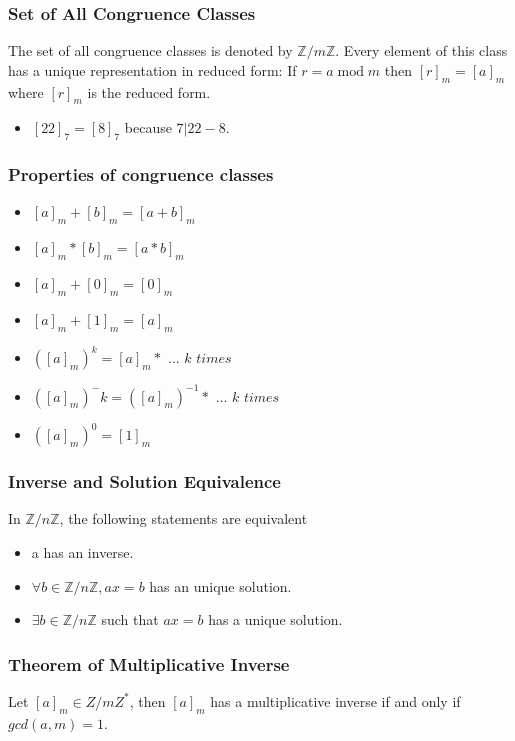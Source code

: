 \documentclass{article}
\begin{document}
\subsubsection{Set of All Congruence Classes} 
\begin{tcolorbox}[width=12.1cm, leftrule=3mm]
The set of all congruence classes is denoted by $ \mathbb{Z} / m\mathbb{Z} $. Every element of this class has a unique representation in reduced form: If $ r = a \;\mathrm{mod}\; m $ then $ [r]_m = [a]_m $ where $ [r]_m $ is the reduced form.
\begin{itemize}
\item $ [22]_7 = [8]_7 $ because $ 7 | 22-8 $.
\end{itemize}
\end{tcolorbox}

\subsubsection{Properties of congruence classes}
\begin{itemize}
\item $ [a]_m + [b]_m = [a+b]_m $
\item $ [a]_m * [b]_m = [a*b]_m $
\item $ [a]_m + [0]_m = [0]_m $
\item $ [a]_m + [1]_m = [a]_m $
\item $ ([a]_m)^k = [a]_m * \textit{ ... k times } $
\item $ ([a]_m)^-k = ([a]_m)^{-1} * \textit{ ... k times } $
\item $ ([a]_m)^0 = [1]_m $
\end{itemize}

\subsubsection{Inverse and Solution Equivalence} In $ \mathbb{Z}/n\mathbb{Z} $, the following statements are equivalent
\begin{itemize}
\item a has an inverse.
\item $ \forall b \in \mathbb{Z}/n\mathbb{Z}, ax = b $ has an unique solution.
\item $ \exists b \in \mathbb{Z}/n\mathbb{Z} $ such that $ ax = b $ has a unique solution.
\end{itemize}

\subsubsection{Theorem of Multiplicative Inverse}
\begin{tcolorbox}[sharp corners, colback=green!30, colframe=green!80!blue, title=Existence of Multiplicative Inverse]
Let $ [a]_m \in Z/mZ^{*} $, then $ [a]_m $ has a multiplicative inverse if and only if $ gcd(a, m) = 1 $.
\end{tcolorbox}
\end{document}
